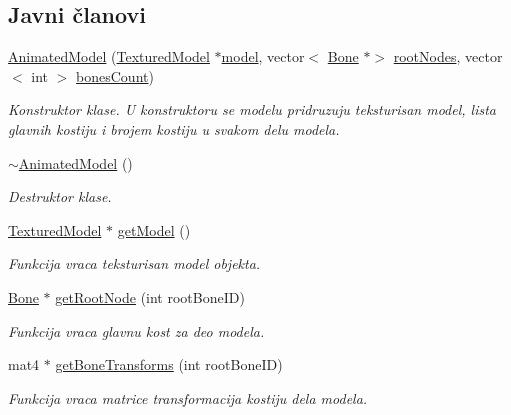 \subsection*{Javni članovi}
\begin{DoxyCompactItemize}
\item 
\hyperlink{classmodel_1_1AnimatedModel_a0255a7b4af5f8fb0f9fb7c042f7016c5}{Animated\+Model} (\hyperlink{classmodel_1_1TexturedModel}{Textured\+Model} $\ast$\hyperlink{classmodel_1_1AnimatedModel_a9856ce11025686cdf78bf5729556613c}{model}, vector$<$ \hyperlink{classmodel_1_1Bone}{Bone} $\ast$$>$ \hyperlink{classmodel_1_1AnimatedModel_a26c1309582cde31ac4dfb8e2436a0cd7}{root\+Nodes}, vector$<$ int $>$ \hyperlink{classmodel_1_1AnimatedModel_aea55cadf949b3bd7bd5eb66d1d6ad304}{bones\+Count})
\begin{DoxyCompactList}\small\item\em Konstruktor klase. U konstruktoru se modelu pridruzuju teksturisan model, lista glavnih kostiju i brojem kostiju u svakom delu modela. \end{DoxyCompactList}\item 
\hyperlink{classmodel_1_1AnimatedModel_a302e899520ce6406d902aaa41be64b07}{$\sim$\+Animated\+Model} ()
\begin{DoxyCompactList}\small\item\em Destruktor klase. \end{DoxyCompactList}\item 
\hyperlink{classmodel_1_1TexturedModel}{Textured\+Model} $\ast$ \hyperlink{classmodel_1_1AnimatedModel_aad16bb9c53cb3b9bacb39e50c5ecee33}{get\+Model} ()
\begin{DoxyCompactList}\small\item\em Funkcija vraca teksturisan model objekta. \end{DoxyCompactList}\item 
\hyperlink{classmodel_1_1Bone}{Bone} $\ast$ \hyperlink{classmodel_1_1AnimatedModel_a1056ac7c71920cd1ff123d372a9dd05d}{get\+Root\+Node} (int root\+Bone\+ID)
\begin{DoxyCompactList}\small\item\em Funkcija vraca glavnu kost za deo modela. \end{DoxyCompactList}\item 
mat4 $\ast$ \hyperlink{classmodel_1_1AnimatedModel_a1769cb021a4128bda636eab48e4c55cc}{get\+Bone\+Transforms} (int root\+Bone\+ID)
\begin{DoxyCompactList}\small\item\em Funkcija vraca matrice transformacija kostiju dela modela. \end{DoxyCompactList}\item 
$$
\end{DoxyCompactItemize}
